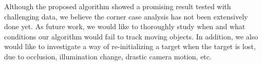 \documentclass[10pt,twocolumn,letterpaper]{article}
\begin{document}
Although the proposed algorithm showed a promising result tested with
challenging data, we believe the corner case analysis has not been
extensively done yet. As future work, we would like to thoroughly
study when and what conditions our algorithm would fail to track
moving objects. In addition, we also would like to investigate a way
of re-initializing a target when the target is lost, due to occlusion,
illumination change, drastic camera motion, etc.

{\small


}
\end{document}
